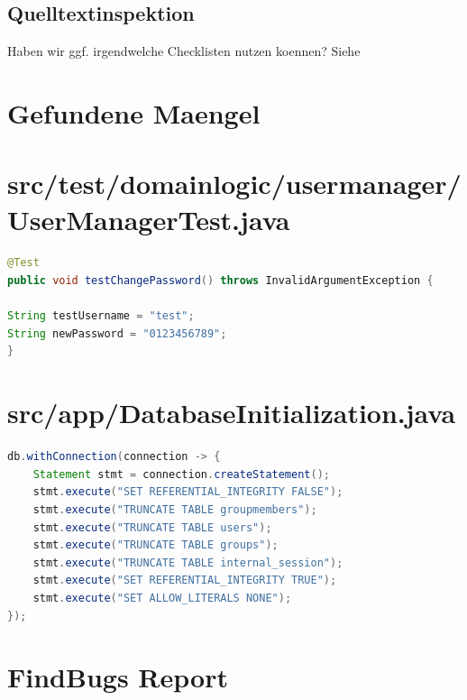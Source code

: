 \documentclass[12pt,DIV14,BCOR10mm,a4paper,twoside,parskip=half-,headsepline,headinclude,english,ngerman,bibliography=totocnumbered]{scrreprt}
\begin{document}
\section{Quelltextinspektion}

Haben wir ggf. irgendwelche Checklisten nutzen koennen?
Siehe

\chapter{Gefundene Maengel}

\printbibliography

\printacronyms[title=Abkürzungsverzeichnis,toctitle=Abkürzungsverzeichnis]
\printglossary[type=main]

\listoffigures      %


\begin{appendices}

\chapter{src/test/domainlogic/usermanager/UserManagerTest.java}
\begin{lstlisting}[language=Java,caption=Hardkodiertes Passwort in einem Test aus der Klasse \texttt{UserManagerTest},label={lst:staticanalysis-hardcoded-pw}]
@Test
public void testChangePassword() throws InvalidArgumentException {

String testUsername = "test";
String newPassword = "0123456789";
}
\end{lstlisting}

\chapter{src/app/DatabaseInitialization.java}
\begin{lstlisting}[language=Java,caption=Von SecureAssist gefundenes False Positive Beispiel fuer Query Injections,label={lst:staticanalysis-query-injection}]
db.withConnection(connection -> {
	Statement stmt = connection.createStatement();
	stmt.execute("SET REFERENTIAL_INTEGRITY FALSE");
	stmt.execute("TRUNCATE TABLE groupmembers");
	stmt.execute("TRUNCATE TABLE users");
	stmt.execute("TRUNCATE TABLE groups");
	stmt.execute("TRUNCATE TABLE internal_session");
	stmt.execute("SET REFERENTIAL_INTEGRITY TRUE");
	stmt.execute("SET ALLOW_LITERALS NONE");
});
\end{lstlisting}

\chapter{FindBugs Report}
\label{staticanalysis-find-bugs}


\end{appendices}
\end{document}
